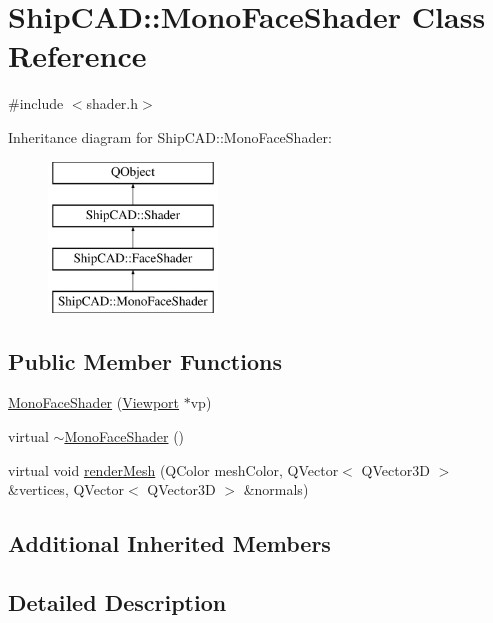 \hypertarget{classShipCAD_1_1MonoFaceShader}{\section{Ship\-C\-A\-D\-:\-:Mono\-Face\-Shader Class Reference}
\label{classShipCAD_1_1MonoFaceShader}
}


{\ttfamily \#include $<$shader.\-h$>$}

Inheritance diagram for Ship\-C\-A\-D\-:\-:Mono\-Face\-Shader\-:\begin{figure}[H]
\begin{center}
\leavevmode
\includegraphics[height=4.000000cm]{classShipCAD_1_1MonoFaceShader}
\end{center}
\end{figure}
\subsection*{Public Member Functions}
\begin{DoxyCompactItemize}
\item 
\hyperlink{classShipCAD_1_1MonoFaceShader_a963aa389c930d6482a58f49b2ccb4473}{Mono\-Face\-Shader} (\hyperlink{classShipCAD_1_1Viewport}{Viewport} $\ast$vp)
\item 
virtual \hyperlink{classShipCAD_1_1MonoFaceShader_ab1f3cb853a5a2b04f9c4944d9eca30b4}{$\sim$\-Mono\-Face\-Shader} ()
\item 
virtual void \hyperlink{classShipCAD_1_1MonoFaceShader_a9a358ec63af4b067449e772cbc735d5a}{render\-Mesh} (Q\-Color mesh\-Color, Q\-Vector$<$ Q\-Vector3\-D $>$ \&vertices, Q\-Vector$<$ Q\-Vector3\-D $>$ \&normals)
\end{DoxyCompactItemize}
\subsection*{Additional Inherited Members}


\subsection{Detailed Description}


